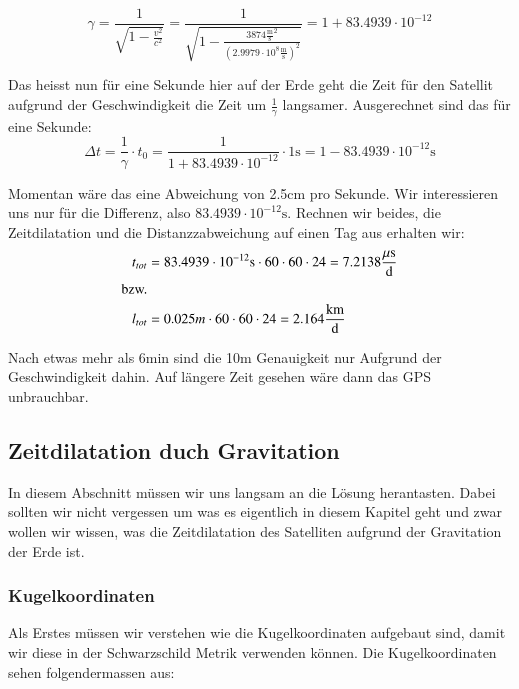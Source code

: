 \begin{refsection}
\begin{equation}
\gamma = \frac{1}{\sqrt{1 - \frac{v^2}{c^2}}} = \frac{1}{\sqrt{1 - \frac{3874 \frac{\text{m}}{\text{s}}^2}{(2.9979 \cdot 10^8 \frac{\text{m}}{\text{s}} )^2}}} = 1 + 83.4939 \cdot 10^{-12}
\end{equation}

\noindent{}Das heisst nun für eine Sekunde hier auf der Erde geht die Zeit für den Satellit aufgrund der Geschwindigkeit die Zeit um \( \frac{1}{\gamma}\) langsamer. Ausgerechnet sind das für eine Sekunde: \\

\begin{equation}
\Delta t = \frac{1}{\gamma} \cdot t_0 = \frac{1}{1 + 83.4939 \cdot 10^{-12}} \cdot 1\text{s} = 1 - 83.4939 \cdot 10^{-12}\text{s}
\end{equation}

\noindent{}Momentan wäre das eine Abweichung von 2.5cm pro Sekunde. Wir interessieren uns nur für die Differenz, also \( 83.4939 \cdot 10^{-12}\text{s} \). Rechnen wir beides, die Zeitdilatation und die Distanzzabweichung auf einen Tag aus erhalten wir:
\begin{align*}
t_{tot} &= 83.4939 \cdot 10^{-12}\text{s} \cdot 60 \cdot 60 \cdot 24 = 7.2138  \frac{\mu \text{s}}{\text{d}}
\\
\textnormal{bzw.}
\\
 l_{tot} &= 0.025m \cdot 60 \cdot 60 \cdot 24 = 2.164 \frac{\text{km}}{\text{d}}
\end{align*}

\noindent{}Nach etwas mehr als 6min sind die 10m Genauigkeit nur Aufgrund der Geschwindigkeit dahin. Auf längere Zeit gesehen wäre dann das GPS unbrauchbar.

\subsection{Zeitdilatation duch Gravitation}
In diesem Abschnitt müssen wir uns langsam an die Lösung herantasten. Dabei sollten wir nicht vergessen um was es eigentlich in diesem Kapitel geht und zwar wollen wir wissen, was die Zeitdilatation des Satelliten aufgrund der Gravitation der Erde ist.

\subsubsection{Kugelkoordinaten}
Als Erstes müssen wir verstehen wie die Kugelkoordinaten aufgebaut sind, damit wir diese in der Schwarzschild Metrik verwenden können. Die Kugelkoordinaten sehen folgendermassen aus:


\end{refsection}

